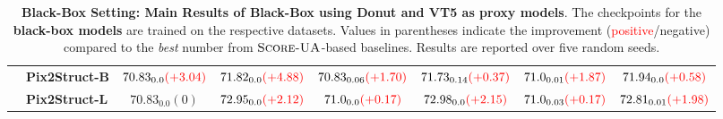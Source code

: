 \begin{table}[t]
\begin{minipage}{0.6\textwidth}
{\begin{tabular}{clcccccc}
            & \textbf{Pix2Struct-B} & $70.83_{0.0}\textcolor{red}{(+3.04)}$ & $71.82_{0.0}\textcolor{red}{(+4.88)}$ & $70.83_{0.06}\textcolor{red}{(+1.70)}$ & $71.73_{0.14}\textcolor{red}{(+0.37)}$ & $71.0_{0.01}\textcolor{red}{(+1.87)}$ & $71.94_{0.0}\textcolor{red}{(+0.58)}$\\
            
            \cmidrule{2-8}
            & \textbf{Pix2Struct-L} & $70.83_{0.0}{(0)}$ & $72.95_{0.0}\textcolor{red}{(+2.12)}$ & $71.0_{0.0}\textcolor{red}{(+0.17)}$ & $72.98_{0.0}\textcolor{red}{(+2.15)}$ & $71.0_{0.03}\textcolor{red}{(+0.17)}$ & $72.81_{0.01}\textcolor{red}{(+1.98)}$\\
            \bottomrule
            \end{tabular}
        }
        \caption{\textbf{Black-Box Setting: Main Results of Black-Box \atk using Donut and VT5 as proxy models}. The checkpoints for the \textbf{black-box models} are trained on the respective datasets. Values in parentheses indicate the improvement (\textcolor{red}{positive}/\textcolor[HTML]{0b5394}{negative}) compared to the \textit{best} number from $\textsc{Score-UA}$-based baselines. Results are reported over five random seeds.}
        \vspace{-0.2in}
        \label{tab:blackbox_results}
    \end{minipage}
    \hfill
    \begin{minipage}{0.39\textwidth}
        \centering
\end{minipage}
\end{table}
